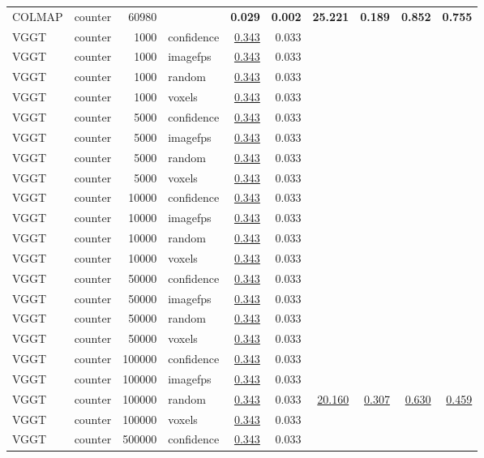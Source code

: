 \begin{table}[H]
\begin{tabular}{llrlrrrrrr}
\midrule
COLMAP & counter & 60980 &  & \textbf{0.029} & \textbf{0.002} & \textbf{25.221} & \textbf{0.189} & \textbf{0.852} & \textbf{0.755} \\
VGGT & counter & 1000 & confidence & \underline{0.343} & 0.033 &  &  &  &  \\
VGGT & counter & 1000 & imagefps & \underline{0.343} & 0.033 &  &  &  &  \\
VGGT & counter & 1000 & random & \underline{0.343} & 0.033 &  &  &  &  \\
VGGT & counter & 1000 & voxels & \underline{0.343} & 0.033 &  &  &  &  \\
VGGT & counter & 5000 & confidence & \underline{0.343} & 0.033 &  &  &  &  \\
VGGT & counter & 5000 & imagefps & \underline{0.343} & 0.033 &  &  &  &  \\
VGGT & counter & 5000 & random & \underline{0.343} & 0.033 &  &  &  &  \\
VGGT & counter & 5000 & voxels & \underline{0.343} & 0.033 &  &  &  &  \\
VGGT & counter & 10000 & confidence & \underline{0.343} & 0.033 &  &  &  &  \\
VGGT & counter & 10000 & imagefps & \underline{0.343} & 0.033 &  &  &  &  \\
VGGT & counter & 10000 & random & \underline{0.343} & 0.033 &  &  &  &  \\
VGGT & counter & 10000 & voxels & \underline{0.343} & 0.033 &  &  &  &  \\
VGGT & counter & 50000 & confidence & \underline{0.343} & 0.033 &  &  &  &  \\
VGGT & counter & 50000 & imagefps & \underline{0.343} & 0.033 &  &  &  &  \\
VGGT & counter & 50000 & random & \underline{0.343} & 0.033 &  &  &  &  \\
VGGT & counter & 50000 & voxels & \underline{0.343} & 0.033 &  &  &  &  \\
VGGT & counter & 100000 & confidence & \underline{0.343} & 0.033 &  &  &  &  \\
VGGT & counter & 100000 & imagefps & \underline{0.343} & 0.033 &  &  &  &  \\
VGGT & counter & 100000 & random & \underline{0.343} & 0.033 & \underline{20.160} & \underline{0.307} & \underline{0.630} & \underline{0.459} \\
VGGT & counter & 100000 & voxels & \underline{0.343} & 0.033 &  &  &  &  \\
VGGT & counter & 500000 & confidence & \underline{0.343} & 0.033 &  &  &  &  \\

\end{tabular}
\end{table}
